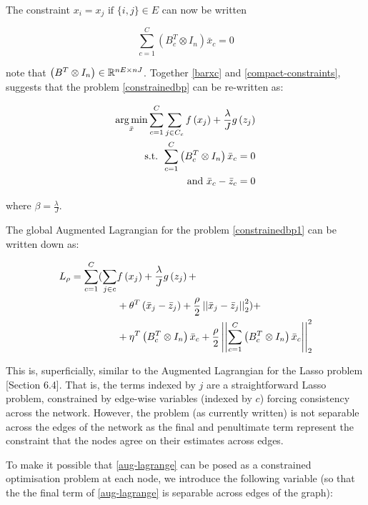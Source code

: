 The constraint \(x_i = x_j \text{ if } \{i,j\} \in E \) can now be written 

\begin{equation}
\sum_{c=1}^C\left(B_c^T \otimes I_n\right)\bar{x}_c = 0
\label{compact-constraints}
\end{equation}

note that \(\left(B^T\otimes I_n \right) \in {\mathbb{R}}^{nE \times nJ}\). Together \eqref{barxc} and \eqref{compact-constraints}, suggests that the problem \eqref{constrainedbp} can be re-written as:

\begin{align}
\operatorname*{arg\,min}_{\bar{x}} \sum_{c=1}^C \sum_{j \in C_c} f\left(x_j\right) + \frac{\lambda}{J} g\left(z_j\right)
\nonumber \\
\text{ s.t. } \sum_{c=1}^C\left(B_c^T \otimes I_n\right)\bar{x}_c = 0 \nonumber \\
\text{ and } \bar{x}_c - \bar{z}_c = 0
\label{constrainedbp1}
\end{align}

where \(\beta = \frac{\lambda}{J}\).

The global Augmented Lagrangian \cite{Boyd2010a}
 for the problem \eqref{constrainedbp1} can be written down as:

\begin{align}
L_\rho = \sum_{c=1}^C  ( \sum_{j \in c} & f\left(x_j\right) + \frac{\lambda}{J} g\left(z_j\right)  + \nonumber \\ & + \theta^T\left(\bar{x}_j - \bar{z}_j\right)  +  \frac{\rho}{2}\left|\left|\bar{x}_j-\bar{z}_j\right|\right|_2^2 ) + \nonumber \\  & + \eta^T\left(B_c^T \otimes I_n\right)\bar{x}_c + \frac{\rho}{2}\left|\left|\sum_{c=1}^C\left(B_c^T \otimes I_n\right)\bar{x}_c\right|\right|_2^2
\label{aug-lagrange}
\end{align}

This is, superficially, similar to the Augmented Lagrangian for the Lasso problem \cite{Boyd2010a}[Section 6.4]. That is, the terms indexed by \(j\) are a straightforward Lasso problem, constrained by edge-wise variables (indexed by \(c\)) forcing consistency across the network. However, the problem (as currently written) is not separable across the edges of the network as the final and penultimate term represent the constraint that the nodes agree on their estimates across edges. 

To make it possible that \ref{aug-lagrange} can be posed  as a constrained optimisation problem at each node, we introduce the following variable (so that the the final term of \ref{aug-lagrange} is separable across edges of the graph):

